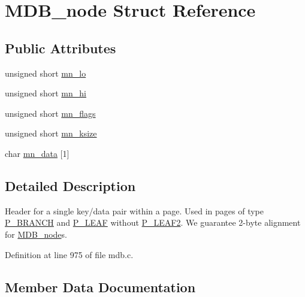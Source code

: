 \hypertarget{struct_m_d_b__node}{}\section{M\+D\+B\+\_\+node Struct Reference}
\label{struct_m_d_b__node}
\subsection*{Public Attributes}
\begin{DoxyCompactItemize}
\item 
unsigned short \mbox{\hyperlink{struct_m_d_b__node_a4024788aea30105dcea5fcf6d4381404}{mn\+\_\+lo}}
\item 
unsigned short \mbox{\hyperlink{struct_m_d_b__node_a0ef414754e56736bcadac31e9a236e86}{mn\+\_\+hi}}
\item 
unsigned short \mbox{\hyperlink{struct_m_d_b__node_a2c59e19a77ae5f2cc63413017dc20ca1}{mn\+\_\+flags}}
\item 
unsigned short \mbox{\hyperlink{struct_m_d_b__node_a0c651711ad2639385a05b64c9e590d84}{mn\+\_\+ksize}}
\item 
char \mbox{\hyperlink{struct_m_d_b__node_aa74167594e5b1c4d99f3457c4bbc2844}{mn\+\_\+data}} \mbox{[}1\mbox{]}
\end{DoxyCompactItemize}


\subsection{Detailed Description}
Header for a single key/data pair within a page. Used in pages of type \mbox{\hyperlink{group__mdb__page_gad6639bfcad26dbcbf7970dfa28f1a930}{P\+\_\+\+B\+R\+A\+N\+CH}} and \mbox{\hyperlink{group__mdb__page_gac85fb59a9a2eda0d33e58b23a7ca019a}{P\+\_\+\+L\+E\+AF}} without \mbox{\hyperlink{group__mdb__page_ga9c80486a549b2efbd5561cdd4df238c4}{P\+\_\+\+L\+E\+A\+F2}}. We guarantee 2-\/byte alignment for \textquotesingle{}\mbox{\hyperlink{struct_m_d_b__node}{M\+D\+B\+\_\+node}}\textquotesingle{}s. 

Definition at line 975 of file mdb.\+c.



\subsection{Member Data Documentation}
\mbox{\label{struct_m_d_b__node_aa74167594e5b1c4d99f3457c4bbc2844}} 
